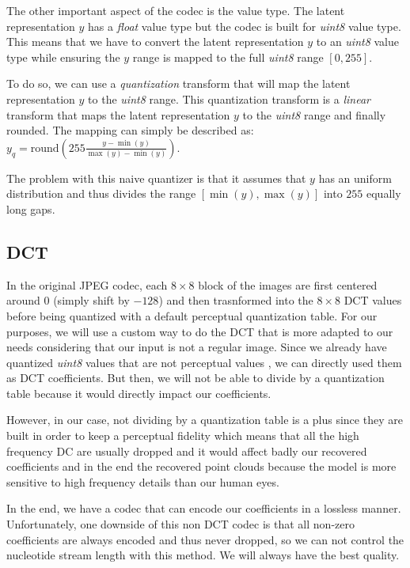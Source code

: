 The other important aspect of the codec is the value type. The latent representation $y$ has a \textit{float} value type but the codec is built for \textit{uint8} value type. This means that we have to convert the latent representation $y$ to an \textit{uint8} value type while ensuring the $y$ range is mapped to the full \textit{uint8} range $[0, 255]$. 

To do so, we can use a \textit{quantization} transform that will map the latent representation $y$ to the \textit{uint8} range. This quantization transform is a \textit{linear} transform that maps the latent representation $y$ to the \textit{uint8} range and finally rounded.
The mapping can simply be described as: $y_q = \text{round} \left(255 \frac{y - \min(y)}{\max(y) - \min(y)}\right)$.

The problem with this naive quantizer is that it assumes that $y$ has an uniform distribution and thus divides the range $[{\min(y), \max(y)}]$ into $255$ equally long gaps. 

\subsection{DCT}

In the original JPEG codec, each $8 \times 8$ block of the images are first centered around $0$ (simply shift by $-128$) and then trasnformed into the $8 \times 8$ DCT values before being quantized with a default perceptual quantization table. 
For our purposes, we will use a custom way to do the DCT that is more adapted to our needs considering that our input is not a regular image.
Since we already have quantized \textit{uint8} values that are not perceptual values , we can directly used them as DCT coefficients.  
But then, we will not be able to divide by a quantization table because it would directly impact our coefficients. 

However, in our case, not dividing by a quantization table is a plus since they are built in order to keep a perceptual fidelity which means that all the high frequency DC are usually dropped and it would affect badly our recovered coefficients and in the end the recovered point clouds because the model is more sensitive to high frequency details than our human eyes.

In the end, we have a codec that can encode our coefficients in a lossless manner. Unfortunately, one downside of this non DCT codec is that all non-zero coefficients are always encoded and thus never dropped, so we can not control the nucleotide stream length with this method. We will always have the best quality.

